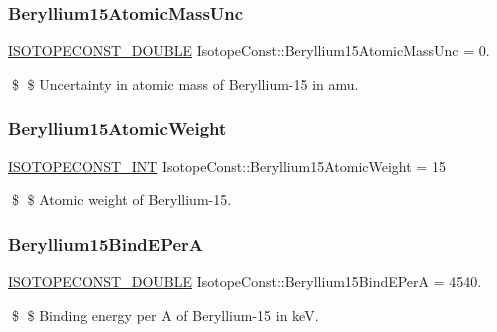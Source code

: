 \subsubsection{\texorpdfstring{Beryllium15\+Atomic\+Mass\+Unc}{Beryllium15AtomicMassUnc}}
{\footnotesize\ttfamily \mbox{\hyperlink{group___isotope_const-_macros_ga8f45a7272ce02c0b4c65c44636ed719a}{I\+S\+O\+T\+O\+P\+E\+C\+O\+N\+S\+T\+\_\+\+D\+O\+U\+B\+LE}} Isotope\+Const\+::\+Beryllium15\+Atomic\+Mass\+Unc = 0.}

\$ \$ Uncertainty in atomic mass of Beryllium-\/15 in amu. \mbox{\label{group___isotope_const-_beryllium-_be15_ga7719b76e11f25e472c402c6cccddc75c}} 
\subsubsection{\texorpdfstring{Beryllium15\+Atomic\+Weight}{Beryllium15AtomicWeight}}
{\footnotesize\ttfamily \mbox{\hyperlink{group___isotope_const-_macros_ga5f18360b3e99483a35c32d789e62621c}{I\+S\+O\+T\+O\+P\+E\+C\+O\+N\+S\+T\+\_\+\+I\+NT}} Isotope\+Const\+::\+Beryllium15\+Atomic\+Weight = 15}

\$ \$ Atomic weight of Beryllium-\/15. \mbox{\label{group___isotope_const-_beryllium-_be15_ga525240af047a38d6ec482bec282ebc85}} 
\subsubsection{\texorpdfstring{Beryllium15\+Bind\+E\+PerA}{Beryllium15BindEPerA}}
{\footnotesize\ttfamily \mbox{\hyperlink{group___isotope_const-_macros_ga8f45a7272ce02c0b4c65c44636ed719a}{I\+S\+O\+T\+O\+P\+E\+C\+O\+N\+S\+T\+\_\+\+D\+O\+U\+B\+LE}} Isotope\+Const\+::\+Beryllium15\+Bind\+E\+PerA = 4540.}

\$ \$ Binding energy per A of Beryllium-\/15 in keV. \mbox{\label{group___isotope_const-_beryllium-_be15_ga3cb5714538722fc3df7e7317bcfa5f3d}} 
